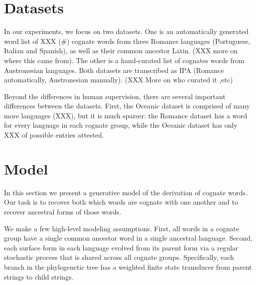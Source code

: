 \documentclass[11pt,a4paper]{article}
\begin{document}
\section{Datasets}

In our experiments, we focus on two datasets. One is an automatically
generated word list of XXX (\#) cognate words from three Romance
languages (Portuguese, Italian and Spanish), as well as their common
ancestor Latin. (XXX more on where this came from). The other is a
hand-curated list of cognates words from Austronesian languages.
Both datasets are transcribed as IPA (Romance automatically,
Austronesian manually). (XXX More on who curated it ,etc)

Beyond the differences in human supervision, there are several
important differences between the datasets. First, the Oceanic
dataset is comprised of many more languages (XXX), but it is much
sparser: the Romance dataset has a word for every language in each
cognate group, while the Oceanic dataset has only XXX of possible
entries attested.

\section{Model}

In this section we present a generative model of the derivation of
cognate words. Our task is to recover both which words are cognate
with one another and to recover ancestral forms of those words.

We make a few high-level modeling assumptions. First, all words in
a cognate group have a single common ancestor word in a single
ancestral language. Second, each surface form in each language
evolved from its parent form via a regular stochastic process that
is shared across all cognate groups. Specifically, each branch in
the phylogenetic tree has a weighted finite state transducer from
parent strings to child strings.
\end{document}
